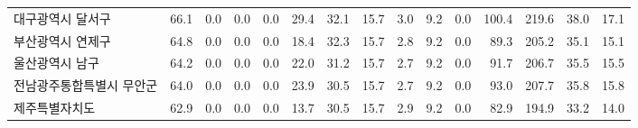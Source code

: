 \begin{defaulttable}
\begin{tabular}{lrrrrrrrrrrrrrr}
대구광역시 달서구 & 66.1 & 0.0 & 0.0 & 0.0 & 29.4 & 32.1 & 15.7 & 3.0 & 9.2 & 0.0 & 100.4 & 219.6 & 38.0 & 17.1 \\
부산광역시 연제구 & 64.8 & 0.0 & 0.0 & 0.0 & 18.4 & 32.3 & 15.7 & 2.8 & 9.2 & 0.0 & 89.3 & 205.2 & 35.1 & 15.1 \\
울산광역시 남구 & 64.2 & 0.0 & 0.0 & 0.0 & 22.0 & 31.2 & 15.7 & 2.7 & 9.2 & 0.0 & 91.7 & 206.7 & 35.5 & 15.5 \\
전남광주통합특별시 무안군 & 64.0 & 0.0 & 0.0 & 0.0 & 23.9 & 30.5 & 15.7 & 2.7 & 9.2 & 0.0 & 93.0 & 207.7 & 35.8 & 15.8 \\
제주특별자치도 & 62.9 & 0.0 & 0.0 & 0.0 & 13.7 & 30.5 & 15.7 & 2.9 & 9.2 & 0.0 & 82.9 & 194.9 & 33.2 & 14.0 \\
\bottomrule
\end{tabular}

\end{defaulttable}
